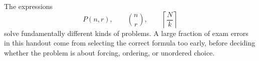 \begin{commonmistake}[title={Final distinction to remember}]
The expressions
\[
P(n,r),\qquad \binom{n}{r},\qquad \left\lceil\frac{N}{k}\right\rceil
\]
solve fundamentally different kinds of problems. A large fraction of exam errors in this handout come from selecting the correct formula too early, before deciding whether the problem is about forcing, ordering, or unordered choice.
\end{commonmistake}